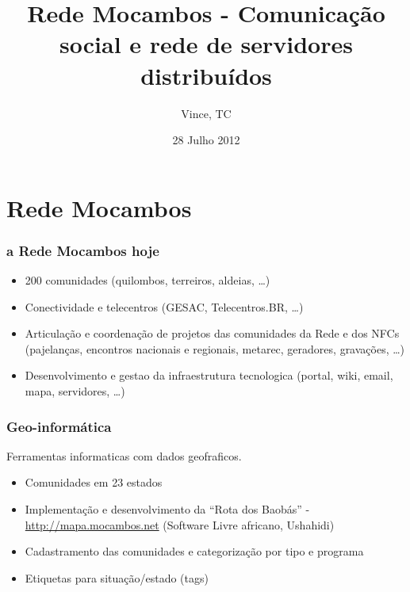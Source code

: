 \documentclass{beamer}
\title{Rede Mocambos - Comunicação social e rede de servidores distribuídos}
\author{Vince, TC}
\institute{Casa de Cultura Tain\~{a} - Rede Mocambos}
\date{28 Julho 2012}
\begin{document}
{
%
\begin{frame}
  \titlepage
\end{frame}


\section{Rede Mocambos}


\begin{frame}
  \frametitle{a Rede Mocambos hoje}

  \begin{itemize}
    \item 200 comunidades (quilombos, terreiros, aldeias, \ldots)
    \item Conectividade e telecentros (GESAC, Telecentros.BR, \ldots)
    \item Articulação e coordenação de projetos das comunidades da
      Rede e dos NFCs (pajelanças, encontros nacionais e regionais, metarec,
      geradores, gravações, \ldots)
    \item Desenvolvimento e gestao da infraestrutura tecnologica
      (portal, wiki, email, mapa, servidores, \ldots)  
    \end{itemize}
\end{frame}

\begin{frame}
  \frametitle{Geo-informática}
  Ferramentas informaticas com dados geofraficos.
  \begin{itemize}
  \item Comunidades em 23 estados
    \item Implementação e desenvolvimento da ``Rota dos Baobás'' -
      \url{http://mapa.mocambos.net} (Software Livre africano, Ushahidi)
    \item Cadastramento das comunidades e categorização por tipo e programa
    \item Etiquetas para situação/estado (tags)
    \end{itemize}
\end{frame}

}
\end{document}
